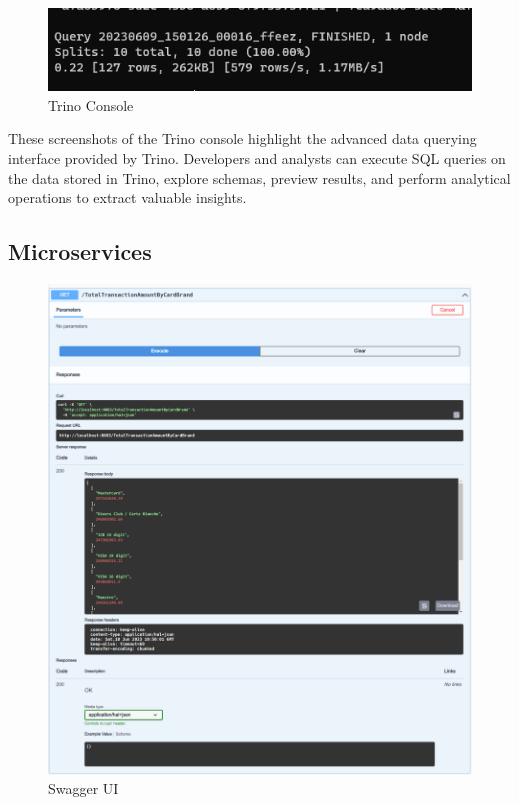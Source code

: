 \begin{figure}[H]
\centering
\includegraphics[width=\linewidth]{images/trino-3.png}
\caption{Trino Console}\label{fig:trino-3}
\end{figure}

These screenshots of the Trino console highlight the advanced data querying interface provided by Trino. Developers and analysts can execute SQL queries on the data stored in Trino, explore schemas, preview results, and perform analytical operations to extract valuable insights.

\subsection{Microservices}

\begin{figure}[H]
\centering
\includegraphics[width=\linewidth]{images/Swagger-UI-1.png}
\caption{Swagger UI}\label{fig:swagger-1}
\end{figure}

